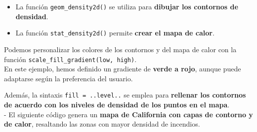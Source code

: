 \documentclass[
]{book}
\providecommand{\tightlist}{%
  \setlength{\itemsep}{0pt}\setlength{\parskip}{0pt}}
\begin{document}
\begin{itemize}
\tightlist
\item
  La función \texttt{geom\_density2d()} se utiliza para \textbf{dibujar los contornos de densidad}.\\
\item
  La función \texttt{stat\_density2d()} permite \textbf{crear el mapa de calor}.
\end{itemize}

Podemos personalizar los colores de los contornos y del mapa de calor con la función \texttt{scale\_fill\_gradient(low,\ high)}.\\
En este ejemplo, hemos definido un gradiente de \textbf{verde a rojo}, aunque puede adaptarse según la preferencia del usuario.

Además, la sintaxis \texttt{fill\ =\ ..level..} se emplea para \textbf{rellenar los contornos de acuerdo con los niveles de densidad de los puntos en el mapa}.\\
- El siguiente código genera un \textbf{mapa de California con capas de contorno y de calor}, resaltando las zonas con mayor densidad de incendios.
\end{document}
